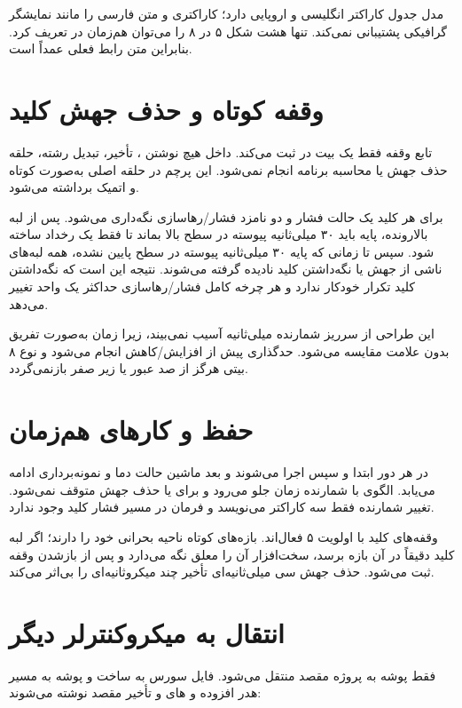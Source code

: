 مدل  جدول کاراکتر انگلیسی و اروپایی دارد؛  کاراکتری  و متن فارسی را مانند نمایشگر گرافیکی پشتیبانی نمی‌کند. تنها هشت شکل ۵ در ۸ را می‌توان هم‌زمان در  تعریف کرد. بنابراین متن رابط فعلی عمداً  است.

\section{وقفه کوتاه و حذف جهش کلید}
تابع  وقفه  فقط یک بیت در
ثبت می‌کند. داخل  هیچ نوشتن ، تأخیر، تبدیل رشته، حلقه حذف جهش یا محاسبه برنامه انجام نمی‌شود. این پرچم در حلقه اصلی به‌صورت کوتاه و اتمیک برداشته می‌شود.

برای هر کلید یک حالت فشار و دو نامزد فشار/رهاسازی نگه‌داری می‌شود. پس از لبه بالارونده، پایه باید ۳۰ میلی‌ثانیه پیوسته در سطح بالا بماند تا فقط یک رخداد ساخته شود. سپس تا زمانی که پایه ۳۰ میلی‌ثانیه پیوسته در سطح پایین نشده، همه لبه‌های ناشی از جهش یا نگه‌داشتن کلید نادیده گرفته می‌شوند. نتیجه این است که نگه‌داشتن کلید تکرار خودکار ندارد و هر چرخه کامل فشار/رهاسازی حداکثر یک واحد تغییر می‌دهد.

این طراحی از سرریز شمارنده میلی‌ثانیه آسیب نمی‌بیند، زیرا زمان به‌صورت تفریق بدون علامت مقایسه می‌شود. حدگذاری پیش از افزایش/کاهش انجام می‌شود و نوع ۸ بیتی هرگز از صد عبور یا زیر صفر بازنمی‌گردد.

\section{حفظ  و کارهای هم‌زمان}
در هر دور  ابتدا  و سپس  اجرا می‌شوند و بعد ماشین حالت دما و نمونه‌برداری  ادامه می‌یابد. الگوی  با شمارنده زمان جلو می‌رود و برای  یا حذف جهش متوقف نمی‌شود. تغییر شمارنده فقط سه کاراکتر می‌نویسد و فرمان  در مسیر فشار کلید وجود ندارد.

وقفه‌های کلید با اولویت ۵ فعال‌اند. بازه‌های کوتاه  ناحیه بحرانی خود را دارند؛ اگر لبه کلید دقیقاً در آن بازه برسد، سخت‌افزار  آن را معلق نگه می‌دارد و پس از بازشدن وقفه ثبت می‌شود. حذف جهش سی میلی‌ثانیه‌ای تأخیر چند میکروثانیه‌ای را بی‌اثر می‌کند.

\section{انتقال به میکروکنترلر دیگر}
فقط پوشه
به پروژه مقصد منتقل می‌شود. فایل سورس به ساخت و پوشه  به مسیر هدر افزوده و های  و تأخیر مقصد نوشته می‌شوند:

